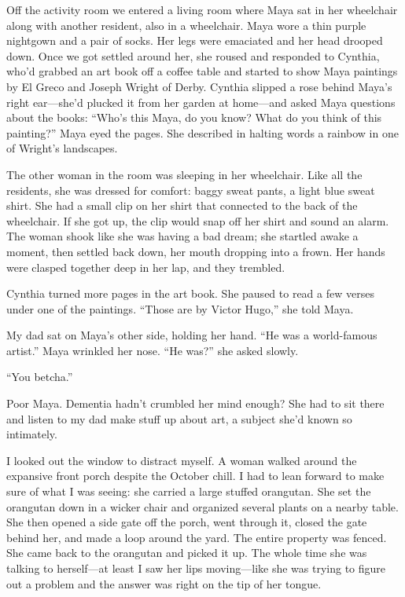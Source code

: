 \documentclass[12pt]{book}
\begin{document}
Off the activity room we entered a living room where Maya sat in her wheelchair along with another resident, also in a wheelchair. Maya wore a thin purple nightgown and a pair of socks. Her legs were emaciated and her head drooped down. Once we got settled around her, she roused and responded to Cynthia, who'd grabbed an art book off a coffee table and started to show Maya paintings by El Greco and Joseph Wright of Derby. Cynthia slipped a rose behind Maya's right ear---she'd plucked it from her garden at home---and asked Maya questions about the books: ``Who's this Maya, do you know? What do you think of this painting?'' Maya eyed the pages. She described in halting words a rainbow in one of Wright's landscapes.

The other woman in the room was sleeping in her wheelchair. Like all the residents, she was dressed for comfort: baggy sweat pants, a light blue sweat shirt. She had a small clip on her shirt that connected to the back of the wheelchair. If she got up, the clip would snap off her shirt and sound an alarm. The woman shook like she was having a bad dream; she startled awake a moment, then settled back down, her mouth dropping into a frown. Her hands were clasped together deep in her lap, and they trembled.

Cynthia turned more pages in the art book. She paused to read a few verses under one of the paintings. ``Those are by Victor Hugo,'' she told Maya.

My dad sat on Maya's other side, holding her hand. ``He was a world-famous artist.'' Maya wrinkled her nose. ``He was?'' she asked slowly.

``You betcha.''

Poor Maya. Dementia hadn't crumbled her mind enough? She had to sit there and listen to my dad make stuff up about art, a subject she'd known so intimately.

I looked out the window to distract myself. A woman walked around the expansive front porch despite the October chill. I had to lean forward to make sure of what I was seeing: she carried a large stuffed orangutan. She set the orangutan down in a wicker chair and organized several plants on a nearby table. She then opened a side gate off the porch, went through it, closed the gate behind her, and made a loop around the yard. The entire property was fenced. She came back to the orangutan and picked it up. The whole time she was talking to herself---at least I saw her lips moving---like she was trying to figure out a problem and the answer was right on the tip of her tongue.
\end{document}
